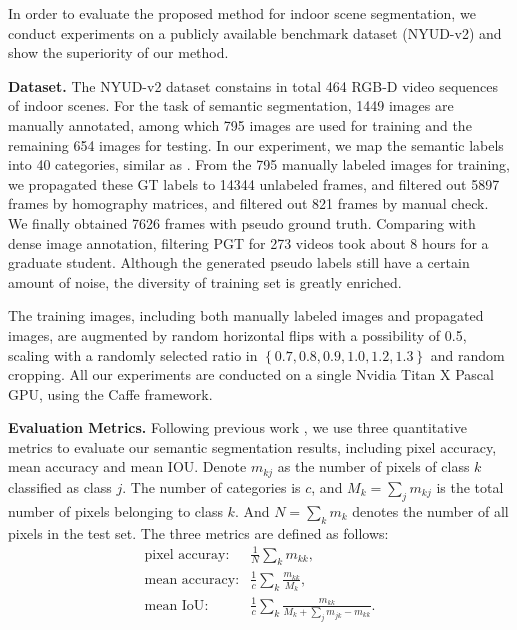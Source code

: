 In order to evaluate the proposed method for indoor scene segmentation, we conduct experiments on a publicly available benchmark dataset (NYUD-v2) and show the superiority of our method.


\noindent\textbf{Dataset.}  
The NYUD-v2 dataset constains in total 464 RGB-D video sequences of indoor scenes. 
%
For the task of semantic segmentation, 1449 images are manually annotated, among which 795 images are used for training and the remaining 654 images for testing.
%
In our experiment, we map the semantic labels into 40 categories, similar as \cite{Gupta2014}.
%
From the 795 manually labeled images for training, we propagated these GT labels to 14344 unlabeled frames, and filtered out 5897 frames by homography matrices, and filtered out 821 frames by manual check. 
We finally obtained 7626 frames with pseudo ground truth. 
%
Comparing with dense image annotation, filtering PGT for 273 videos took about 8 hours for a graduate student.
%
Although the generated pseudo labels still have a certain amount of noise, the diversity of training set is greatly enriched. 



The training images, including both manually labeled images and propagated images, are augmented by random horizontal flips with a possibility of 0.5, scaling with a randomly selected ratio in $\left\{0.7,0.8,0.9,1.0,1.2,1.3\right\}$ and random cropping. 
%
All our experiments are conducted on a single Nvidia Titan X Pascal GPU, using the Caffe framework.

\noindent\textbf{Evaluation Metrics.}  
Following previous work
\cite{Eigen2015,Gupta2014,Kendall2015,Lin2016,Lin2017,Li2016,Cheng2017,Park2017,Xu2018,Zhang2018,Jiao2018}, we use three quantitative metrics to evaluate our semantic segmentation results, including pixel accuracy, mean accuracy and mean IOU. 
Denote $m_{kj}$ as the number of pixels of class ${k}$ classified as class ${j}$.
The number of categories is $c$, and $M_{k} = \sum_{j}m_{kj}$ is the total number of pixels belonging to class $k$. 
%
And $N = \sum_{k}m_{k}$ denotes the number of all pixels in the test set.
%
The three metrics are defined as follows:
\begin{equation}\label{eq:metric}
\begin{array}{rl}
\text{pixel accuray}: &  \frac{1}{N}\sum_{k}m_{kk}, \\
\text{mean accuracy}: &\frac{1}{c}\sum_{k}\frac{m_{kk}}{M_{k}}, \\
\text{mean IoU}: &\frac{1}{c}\sum_{k}\frac{m_{kk}}{ M_{k}+\sum_{j}m_{jk}-m_{kk}}.
\end{array}
\end{equation}

